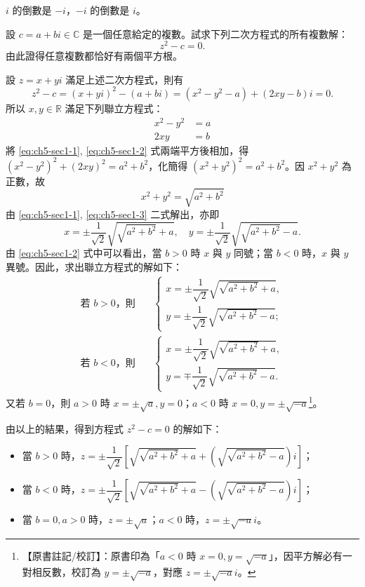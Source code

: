 \begin{example}
$i$ 的倒數是 $-i$，$-i$ 的倒數是 $i$。
\end{example}

\begin{discussion}
設 $c=a+bi \in \mathbb{C}$ 是一個任意給定的複數。試求下列二次方程式的所有複數解：
\[
z^2-c=0.
\]
由此證得任意複數都恰好有兩個平方根。
\end{discussion}

\begin{solution}
設 $z=x+yi$ 滿足上述二次方程式，則有
\[
z^2-c = (x+yi)^2-(a+bi) = (x^2-y^2-a)+(2xy-b)i = 0.
\]
所以 $x, y \in \mathbb{R}$ 滿足下列聯立方程式：
\begin{align}
x^2-y^2 &= a \label{eq:ch5-sec1-1} \\
2xy &= b \label{eq:ch5-sec1-2}
\end{align}
將 \eqref{eq:ch5-sec1-1}, \eqref{eq:ch5-sec1-2} 式兩端平方後相加，得 $(x^2-y^2)^2+(2xy)^2 = a^2+b^2$，化簡得 $(x^2+y^2)^2 = a^2+b^2$。因 $x^2+y^2$ 為正數，故
\begin{equation}
x^2+y^2 = \sqrt{a^2+b^2} \label{eq:ch5-sec1-3}
\end{equation}
由 \eqref{eq:ch5-sec1-1}, \eqref{eq:ch5-sec1-3} 二式解出，亦即
\[
x = \pm \frac{1}{\sqrt{2}}\sqrt{\sqrt{a^2+b^2}+a}, \quad y = \pm\frac{1}{\sqrt{2}}\sqrt{\sqrt{a^2+b^2}-a}.
\]
由 \eqref{eq:ch5-sec1-2} 式中可以看出，當 $b>0$ 時 $x$ 與 $y$ 同號；當 $b<0$ 時，$x$ 與 $y$ 異號。因此，求出聯立方程式的解如下：
\begin{align*}
\text{若 } b>0\text{，則} \quad & \begin{cases} x = \pm\dfrac{1}{\sqrt{2}}\sqrt{\sqrt{a^2+b^2}+a}, \\ y = \pm\dfrac{1}{\sqrt{2}}\sqrt{\sqrt{a^2+b^2}-a}; \end{cases} \\
\text{若 } b<0\text{，則} \quad & \begin{cases} x = \pm\dfrac{1}{\sqrt{2}}\sqrt{\sqrt{a^2+b^2}+a}, \\ y = \mp\dfrac{1}{\sqrt{2}}\sqrt{\sqrt{a^2+b^2}-a}. \end{cases}
\end{align*}
又若 $b=0$，則 $a>0$ 時 $x=\pm\sqrt{a}, y=0$；$a<0$ 時 $x=0, y=\pm\sqrt{-a}$\label{note:b4s-ch5-p259-errata}\footnote{【原書註記/校訂】：原書印為「$a<0$ 時 $x=0, y=\sqrt{-a}$」，因平方解必有一對相反數，校訂為 $y=\pm\sqrt{-a}$，對應 $z=\pm\sqrt{-a}i$。}。

由以上的結果，得到方程式 $z^2-c=0$ 的解如下：
\begin{itemize}
  \item 當 $b>0$ 時，$z = \pm\dfrac{1}{\sqrt{2}}\left[\sqrt{\sqrt{a^2+b^2}+a} + \left(\sqrt{\sqrt{a^2+b^2}-a}\right)i\right]$；
  \item 當 $b<0$ 時，$z = \pm\dfrac{1}{\sqrt{2}}\left[\sqrt{\sqrt{a^2+b^2}+a} - \left(\sqrt{\sqrt{a^2+b^2}-a}\right)i\right]$；
  \item 當 $b=0, a>0$ 時，$z = \pm\sqrt{a}$；$a<0$ 時，$z = \pm\sqrt{-a}i$。 \qedhere
\end{itemize}
\end{solution}

